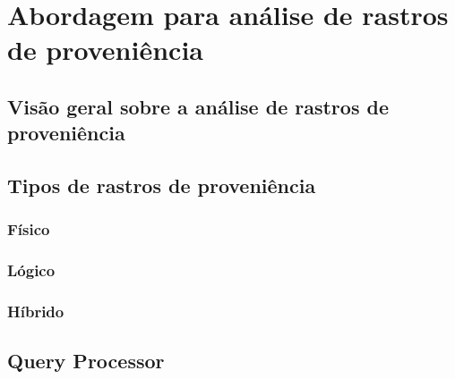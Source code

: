 
\chapter{Abordagem para análise de rastros de proveniência}%
\label{chap:rastros-de-proveniencia}


\section{Visão geral sobre a análise de rastros de proveniência}

 
\section{Tipos de rastros de proveniência}


\subsection{Físico}

\subsection{Lógico}

\subsection{Híbrido}


\section{Query Processor}




